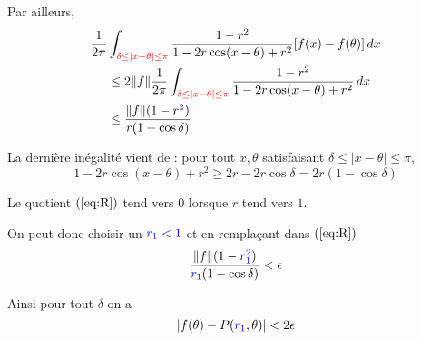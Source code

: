 \documentclass[
	10pt, %
	xcolor={svgnames}
]{beamer}
\begin{document}
\begin{frame}
	Par ailleurs,
	\begin{align}
		\frac{1}{2\pi} &\int_{\mathcolor{red}{\delta \leq {\left\lvert x - \theta \right\rvert} \leq \pi}} 
		\frac{1 - r^{2}}{1-2r\cos(x-\theta)+r^{2}}
		\lbrack f(x)-f(\theta) \rbrack \, dx \\
			       &\leq 2 {\left\lVert f \right\rVert}
		\frac{1}{2\pi} \int_{\mathcolor{red}{\delta \leq {\left\lvert x - \theta \right\rvert} \leq \pi}} 
		\frac{1 - r^{2}}{1-2r\cos(x-\theta)+r^{2}} \, dx \\
			       &\leq \frac{{\left\lVert f \right\rVert}(1-r^{2})}{r(1-\cos\delta)} \label{eq:R}
	\end{align}

	La dernière inégalité vient de :  pour tout \(x,\theta \) satisfaisant \(\delta \leq {\left\lvert x - \theta \right\rvert} \leq \pi \),
	\begin{equation*}
		1 - 2r \cos(x-\theta) + r^{2} \geq 2r - 2r \cos \delta = 2r(1-\cos\delta)
	\end{equation*}

Le quotient \( (\ref{eq:R}) \) tend vers \( 0 \) lorsque \( r \) tend vers \( 1 \).

On peut donc choisir un \( \mathcolor{blue}{r_1 < 1} \) et en remplaçant dans \( (\ref{eq:R}) \)
\begin{equation*}
	\frac{{\left\lVert f \right\rVert}(1-\mathcolor{blue}{r_1^{2}})}{\mathcolor{blue}{r_1}(1-\cos\delta)} < \epsilon
\end{equation*}

Ainsi pour tout \( \delta \) on a 
\begin{equation*}
	{\left\lvert f(\theta) - P(\mathcolor{blue}{r_1}, \theta) \right\rvert} < 2\epsilon
\end{equation*}
\end{frame}
\end{document}
